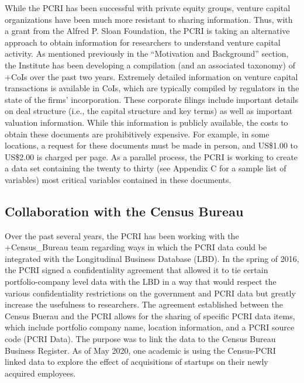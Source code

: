 \documentclass[
]{book}
\begin{document}
While the PCRI has been successful with private equity groups, venture capital organizations have been much more resistant to sharing information. Thus, with a grant from the Alfred P. Sloan Foundation, the PCRI is taking an alternative approach to obtain information for researchers to understand venture capital activity. As mentioned previously in the ``Motivation and Background'' section, the Institute has been developing a compilation (and an associated taxonomy) of +CoIs\textbar{} over the past two years. Extremely detailed information on venture capital transactions is available in CoIs, which are typically compiled by regulators in the state of the firms' incorporation. These corporate filings include important details on deal structure (i.e., the capital structure and key terms) as well as important valuation information. While this information is publicly available, the costs to obtain these documents are prohibitively expensive. For example, in some locations, a request for these documents must be made in person, and US\$1.00 to US\$2.00 is charged per page. As a parallel process, the PCRI is working to create a data set containing the twenty to thirty (see Appendix C for a sample list of variables) most critical variables contained in these documents.

\hypertarget{collaboration-with-the-census-bureau}{%
\subsection{Collaboration with the Census Bureau}\label{collaboration-with-the-census-bureau}}

Over the past several years, the PCRI has been working with the +Census\_Bureau\textbar{} team regarding ways in which the PCRI data could be integrated with the Longitudinal Business Database (LBD). In the spring of 2016, the PCRI signed a confidentiality agreement that allowed it to tie certain portfolio-company level data with the LBD in a way that would respect the various confidentiality restrictions on the government and PCRI data but greatly increase the usefulness to researchers. The agreement established between the Census Buerau and the PCRI allows for the sharing of specific PCRI data items, which include portfolio company name, location information, and a PCRI source code (PCRI Data). The purpose was to link the data to the Census Bureau Business Register. As of May 2020, one academic is using the Census-PCRI linked data to explore the effect of acquisitions of startups on their newly acquired employees.
\end{document}
